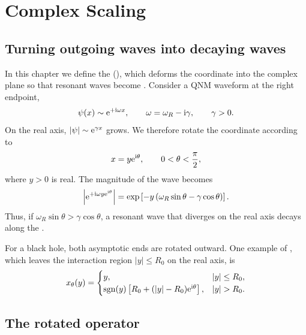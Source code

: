 \chapter{Complex Scaling}
\label{chap:complex-scaling}

\section{Turning outgoing waves into decaying waves}

In this chapter we define the  (), which deforms the coordinate into the complex plane so that resonant waves become . Consider a QNM waveform at the right endpoint,
\begin{equation}
\psi(x)
\sim
\mathrm{e}^{+\mathrm{i}\omega x},
\qquad
\omega=\omega_R-\mathrm{i}\gamma,
\qquad
\gamma>0.
\end{equation}
On the real axis, $|\psi|\sim\mathrm{e}^{\gamma x}$ grows. We therefore rotate the coordinate according to
\begin{equation}
x
=
y\mathrm{e}^{\mathrm{i}\theta},
\qquad
0<\theta<\frac{\pi}{2},
\label{eq:uniform-complex-scaling}
\end{equation}
where $y>0$ is real. The magnitude of the wave becomes
\begin{equation}
\left|
\mathrm{e}^{+\mathrm{i}\omega y\mathrm{e}^{\mathrm{i}\theta}}
\right|
=
\exp\left[
-y\left(
\omega_R\sin\theta-\gamma\cos\theta
\right)
\right].
\label{eq:complex-scaling-decay}
\end{equation}
Thus, if $\omega_R\sin\theta>\gamma\cos\theta$, a resonant wave that diverges on the real axis decays along the .

For a black hole, both asymptotic ends are rotated outward. One example of , which leaves the interaction region $|y|\leq R_0$ on the real axis, is
\begin{equation}
x_\theta(y)
=
\begin{cases}
y,
& |y|\leq R_0,
\\
\sgn(y)
\left[
R_0+(|y|-R_0)\rme^{\rmi\theta}
\right],
& |y|>R_0.
\end{cases}
\label{eq:exterior-complex-scaling}
\end{equation}

\section{The rotated operator}

